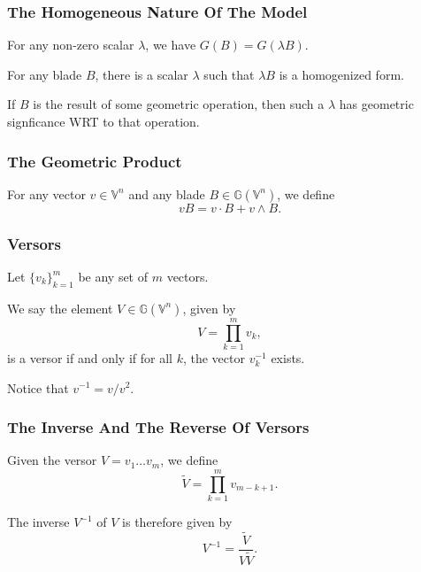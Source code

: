 \documentclass{beamer}
\newcommand{\G}{\mathbb{G}}
\newcommand{\V}{\mathbb{V}}
\begin{document}
\begin{frame}
\frametitle{The Homogeneous Nature Of The Model}
For any non-zero scalar $\lambda$, we have $G(B)=G(\lambda B)$.\pause

For any blade $B$, there is a scalar $\lambda$ such that $\lambda B$ is a homogenized form.\pause

If $B$ is the result of some geometric operation, then such a $\lambda$ has geometric signficance
WRT to that operation.
\end{frame}

\begin{frame}
\frametitle{The Geometric Product}
\begin{definition}
For any vector $v\in\V^n$ and any blade $B\in\G(\V^n)$, we define
\begin{equation*}
vB = v\cdot B + v\wedge B.
\end{equation*}
\end{definition}
\end{frame}

\begin{frame}
\frametitle{Versors}
Let $\{v_k\}_{k=1}^m$ be any set of $m$ vectors.\pause
\begin{definition}
We say the element $V\in\G(\V^n)$, given by
\begin{equation*}
V = \prod_{k=1}^m v_k,
\end{equation*}
is a versor if and only if for all $k$, the vector $v_k^{-1}$ exists.
\end{definition}\pause
Notice that $v^{-1}=v/v^2$.
\end{frame}

\begin{frame}
\frametitle{The Inverse And The Reverse Of Versors}
\begin{definition}
Given the versor $V=v_1\dots v_m$, we define
\begin{equation*}
\tilde{V} = \prod_{k=1}^m v_{m-k+1}.
\end{equation*}
\end{definition}\pause
The inverse $V^{-1}$ of $V$ is therefore given by
\begin{equation*}
V^{-1} = \frac{\tilde{V}}{V\tilde{V}}.
\end{equation*}
\end{frame}
\end{document}
